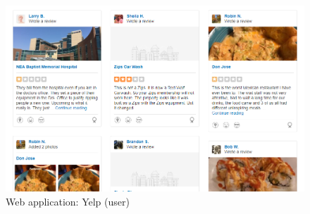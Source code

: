 \documentclass[12pt,a4paper]{report}
\begin{document}
	\begin{figure}[H]
		\centering
		\includegraphics[width=5in,keepaspectratio]{yelp2.png}
		\caption{ Web application: Yelp (user)\protect{}\protect\footnotemark[\thefootnote]}
		
		
		\label{label-yelp2}
	\end{figure}
\end{document}
